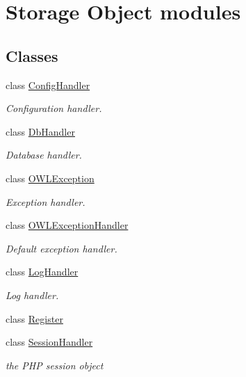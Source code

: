 \hypertarget{group__OWL__SO__LAYER}{
\section{Storage Object modules}
\label{group__OWL__SO__LAYER}
}
\subsection*{Classes}
\begin{CompactItemize}
\item 
class \hyperlink{classConfigHandler}{ConfigHandler}
\begin{CompactList}\small\item\em Configuration handler. \item\end{CompactList}\item 
class \hyperlink{classDbHandler}{DbHandler}
\begin{CompactList}\small\item\em Database handler. \item\end{CompactList}\item 
class \hyperlink{classOWLException}{OWLException}
\begin{CompactList}\small\item\em Exception handler. \item\end{CompactList}\item 
class \hyperlink{classOWLExceptionHandler}{OWLExceptionHandler}
\begin{CompactList}\small\item\em Default exception handler. \item\end{CompactList}\item 
class \hyperlink{classLogHandler}{LogHandler}
\begin{CompactList}\small\item\em Log handler. \item\end{CompactList}\item 
class \hyperlink{classRegister}{Register}
\item 
class \hyperlink{classSessionHandler}{SessionHandler}
\begin{CompactList}\small\item\em the PHP session object \item\end{CompactList}\end{CompactItemize}

